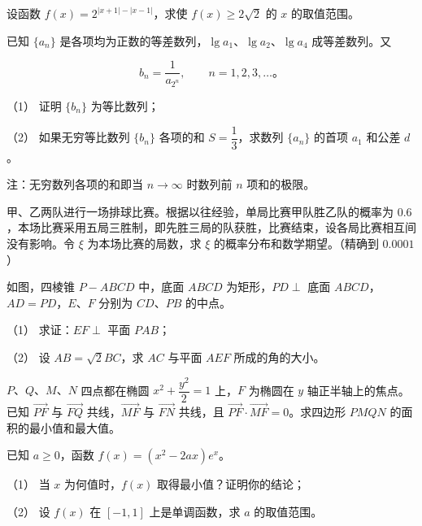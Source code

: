 \begin{question}
设函数 $f(x)=2^{|x+1|-|x-1|}$，求使 $f(x)\geqslant2\sqrt2$ 的 $x$ 的取值范围。

\end{question}
\begin{question}
已知 $\{a_n\}$ 是各项均为正数的等差数列，$\lg a_1\text{、}\lg a_2\text{、}\lg a_4$ 成等差数列。又

\nopagebreak[4]
\[
b_n=\frac1{a_{2^n}},\qquad n=1,2,3,\ldots\text{。}
\]

（1） 证明 $\{b_n\}$ 为等比数列；

（2） 如果无穷等比数列 $\{b_n\}$ 各项的和 $S=\dfrac13$，求数列 $\{a_n\}$ 的首项 $a_1$ 和公差 $d$。

注：无穷数列各项的和即当 $n\to\infty$ 时数列前 $n$ 项和的极限。

\end{question}
\begin{question}
甲、乙两队进行一场排球比赛。根据以往经验，单局比赛甲队胜乙队的概率为 $0.6$，本场比赛采用五局三胜制，即先胜三局的队获胜，比赛结束，设各局比赛相互间没有影响。令 $\xi$ 为本场比赛的局数，求 $\xi$ 的概率分布和数学期望。（精确到 $0.0001$）

\Needspace{0.4\textheight}
\end{question}
\begin{question}
如图，四棱锥 $P-ABCD$ 中，底面 $ABCD$ 为矩形，$PD\perp$ 底面 $ABCD$，$AD=PD$，$E\text{、}F$ 分别为 $CD\text{、}PB$ 的中点。
\nopagebreak[4]
\begin{center}\end{center}
\nopagebreak[4]
（1） 求证：$EF\perp$ 平面 $PAB$；

（2） 设 $AB=\sqrt2BC$，求 $AC$ 与平面 $AEF$ 所成的角的大小。

\end{question}
\begin{question}
$P\text{、}Q\text{、}M\text{、}N$ 四点都在椭圆 $x^2+\dfrac{y^2}{2}=1$ 上，$F$ 为椭圆在 $y$ 轴正半轴上的焦点。已知 $\overrightarrow{PF}$ 与 $\overrightarrow{FQ}$ 共线，$\overrightarrow{MF}$ 与 $\overrightarrow{FN}$ 共线，且 $\overrightarrow{PF}\cdot\overrightarrow{MF}=0$。求四边形 $PMQN$ 的面积的最小值和最大值。

\end{question}
\begin{question}
已知 $a\geqslant0$，函数 $f(x)=(x^2-2ax)e^x$。

（1） 当 $x$ 为何值时，$f(x)$ 取得最小值？证明你的结论；

（2） 设 $f(x)$ 在 $[-1,1]$ 上是单调函数，求 $a$ 的取值范围。

\end{question}